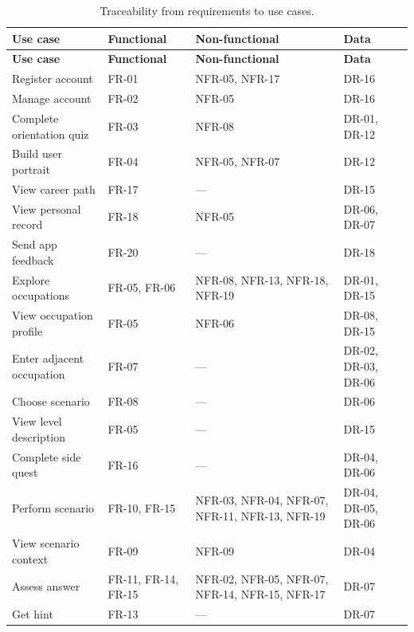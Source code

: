 {\small
\begin{longtable}{|>{\raggedright\arraybackslash}p{}|>{\raggedright\arraybackslash}p{}|>{\raggedright\arraybackslash}p{}|>{\raggedright\arraybackslash}p{}|}
\caption{Traceability from requirements to use cases.} \\
\hline
\textbf{Use case} & \textbf{Functional} & \textbf{Non-functional} & \textbf{Data} \\ \hline
\endfirsthead
\hline
\textbf{Use case} & \textbf{Functional} & \textbf{Non-functional} & \textbf{Data} \\ \hline
\endhead
Register account & FR-01 & NFR-05, NFR-17 & DR-16 \\ \hline
Manage account & FR-02 & NFR-05 & DR-16 \\ \hline
Complete orientation quiz & FR-03 & NFR-08 & DR-01, DR-12 \\ \hline
Build user portrait & FR-04 & NFR-05, NFR-07 & DR-12 \\ \hline
View career path & FR-17 & --- & DR-15 \\ \hline
View personal record & FR-18 & NFR-05 & DR-06, DR-07 \\ \hline
Send app feedback & FR-20 & --- & DR-18 \\ \hline
Explore occupations & FR-05, FR-06 & NFR-08, NFR-13, NFR-18, NFR-19 & DR-01, DR-15 \\ \hline
View occupation profile & FR-05 & NFR-06 & DR-08, DR-15 \\ \hline
Enter adjacent occupation & FR-07 & --- & DR-02, DR-03, DR-06 \\ \hline
Choose scenario & FR-08 & --- & DR-06 \\ \hline
View level description & FR-05 & --- & DR-15 \\ \hline
Complete side quest & FR-16 & --- & DR-04, DR-06 \\ \hline
Perform scenario & FR-10, FR-15 & NFR-03, NFR-04, NFR-07, NFR-11, NFR-13, NFR-19 & DR-04, DR-05, DR-06 \\ \hline
View scenario context & FR-09 & NFR-09 & DR-04 \\ \hline
Assess answer & FR-11, FR-14, FR-15 & NFR-02, NFR-05, NFR-07, NFR-14, NFR-15, NFR-17 & DR-07 \\ \hline
Get hint & FR-13 & --- & DR-07 \\ \hline

\end{longtable}}
